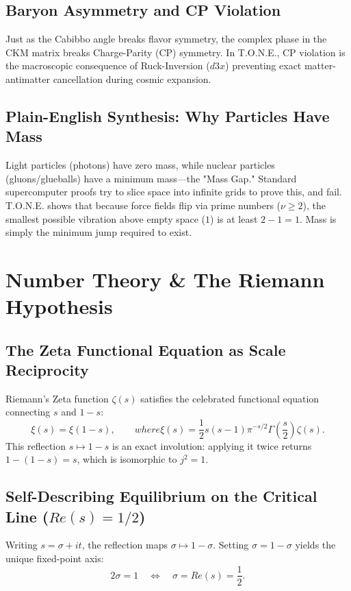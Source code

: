 \documentclass[11pt,a4paper,oneside]{article}
\def\dddot#1{d3#1}%
\def\text#1{#1}%
\theoremstyle{definition}
\begin{document}
\subsection{Baryon Asymmetry and CP Violation}
Just as the Cabibbo angle breaks flavor symmetry, the complex phase in the CKM matrix breaks Charge-Parity (CP) symmetry. In T.O.N.E., CP violation is the macroscopic consequence of Ruck-Inversion ($\dddot{x}$) preventing exact matter-antimatter cancellation during cosmic expansion.
\subsection{Plain-English Synthesis: Why Particles Have Mass}
\begin{noobbox}
Light particles (photons) have zero mass, while nuclear particles (gluons/glueballs) have a minimum mass—the "Mass Gap." Standard supercomputer proofs try to slice space into infinite grids to prove this, and fail. T.O.N.E. shows that because force fields flip via prime numbers ($\nu \ge 2$), the smallest possible vibration above empty space ($1$) is at least $2 - 1 = 1$. Mass is simply the minimum jump required to exist.
\end{noobbox}

\section{Number Theory \& The Riemann Hypothesis}
\subsection{The Zeta Functional Equation as Scale Reciprocity}
Riemann's Zeta function $\zeta(s)$ satisfies the celebrated functional equation connecting $s$ and $1 - s$:
\begin{equation}
\xi(s) = \xi(1 - s), \qquad \text{where } \xi(s) = \frac{1}{2}s(s-1)\pi^{-s/2}\Gamma\left(\frac{s}{2}\right)\zeta(s).
\end{equation}
This reflection $s \mapsto 1 - s$ is an exact involution: applying it twice returns $1 - (1 - s) = s$, which is isomorphic to $j^2 = 1$.
\subsection{Self-Describing Equilibrium on the Critical Line ($\text{Re}(s) = 1/2$)}
Writing $s = \sigma + it$, the reflection maps $\sigma \mapsto 1 - \sigma$. Setting $\sigma = 1 - \sigma$ yields the unique fixed-point axis:
\begin{equation}
2\sigma = 1 \quad \Longleftrightarrow \quad \sigma = \text{Re}(s) = \frac{1}{2}.
\end{equation}
\end{document}
